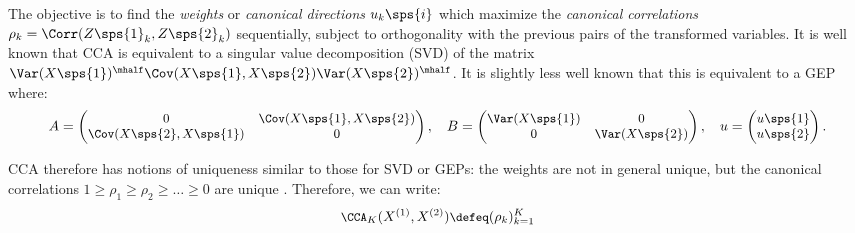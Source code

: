 The objective is to find the \textit{weights} or \textit{canonical directions} $u_k\sps{i}$ which maximize the \textit{canonical correlations} $\rho_k = \Corr(Z\sps{1}_k, Z\sps{2}_k)$
sequentially, subject to orthogonality with the previous pairs of the transformed variables.
It is well known that CCA is equivalent to a singular value decomposition (SVD) of the matrix $\Var(X\sps{1})^\mhalf \Cov(X\sps{1}, X\sps{2}) \Var(X\sps{2})^\mhalf$.
It is slightly less well known \citep{borga_learning_1998} that this is equivalent to a GEP where:
\begin{equation}\label{eq:cca-GEV}\small
	A = \begin{pmatrix} 0 &\Cov(X\sps{1}, X\sps{2}) \\ \Cov(X\sps{2}, X\sps{1}) & 0 \end{pmatrix}, \quad
	B = \begin{pmatrix}\Var(X\sps{1}) & 0 \\ 0 & \Var(X\sps{2}) \end{pmatrix}, \quad
	u =\begin{pmatrix}	u\sps{1} \\ u\sps{2} \end{pmatrix}.
\end{equation}

CCA therefore has notions of uniqueness similar to those for SVD or GEPs: the weights are not in general unique, but the canonical correlations $1 \geq \rho_1 \geq \rho_2 \geq \dots \geq 0$ are unique \citep{mills1988calculation}. Therefore, we can write:
\begin{align}\label{eq:cca-vector-of-correlations-def}\small
    \CCA_K(X^{(1)},X^{(2)}) \defeq (\rho_k)_{k=1}^K
\end{align}

